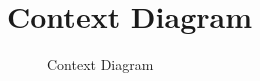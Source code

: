 \appendix
\section{Context Diagram}
\begin{figure}[!h]
	\vspace{1cm}
	\centering
	\setlength\fboxsep{7pt}
	\setlength\fboxrule{0.5pt}
	\label{appendix_a_context_diagram}
	\caption{Context Diagram}
\end{figure}
